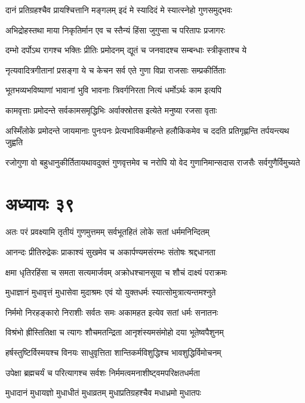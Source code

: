 \twolineshloka
{दानं प्रतिग्रहश्चैव प्रायश्चित्तानि मङ्गलम्}
{इदं मे स्यादिदं मे स्यात्स्नेहो गुणसमुद्भवः}


\twolineshloka
{अभिद्रोहस्तथा माया निकृतिर्मान एव च}
{स्तैन्यं हिंसा जुगुप्सा च परितापः प्रजागरः}


\twolineshloka
{दम्भो दर्पोऽथ रागश्च भक्तिः प्रीतिः प्रमोदनम्}
{द्यूतं च जनवादश्च सम्बन्धाः स्त्रीकृताश्च ये}


\twolineshloka
{नृत्यवादित्रगीतानां प्रसङ्गा ये च केचन}
{सर्व एते गुणा विप्रा राजसाः सम्प्रकीर्तिताः}


\twolineshloka
{भूतभव्यभविष्याणां भावानां भुवि भावनाः}
{त्रिवर्गनिरता नित्यं धर्मोऽर्थः काम इत्यपि}


\twolineshloka
{कामवृत्ताः प्रमोदन्ते सर्वकामसमृद्धिभिः}
{अर्वाक्स्रोतस इत्येते मनुष्या रजसा वृताः}


\threelineshloka
{अस्मिँलोके प्रमोदन्ते जायमानाः पुनःपनः}
{प्रेत्यभाविकमीहन्ते हलौकिकमेव च}
{ददति प्रतिगृह्णन्ति तर्पयन्त्यथ जुह्वति}


\twolineshloka
{रजोगुणा वो बहुधानुकीर्तितायथावदुक्तं गुणवृत्तमेव च}
{नरोपि यो वेद गुणानिमान्सदास राजसैः सर्वगुणैर्विमुच्यते}


\chapter{अध्यायः ३९}
\twolineshloka
{अतः परं प्रवक्ष्यामि तृतीयं गुणमुत्तमम्}
{सर्वभूतहितं लोके सतां धर्ममनिन्दितम्}


\twolineshloka
{आनन्दः प्रीतिरुद्रेकः प्राकाश्यं सुखमेव च}
{अकार्पण्यमसंरम्भः संतोषः श्रद्दधानता}


\twolineshloka
{क्षमा धृतिरहिंसा च समता सत्यमार्जवम्}
{अक्रोधश्चानसूया च शौचं दाक्ष्यं पराक्रमः}


\twolineshloka
{मुधाज्ञानं मुधावृत्तं मुधासेवा मुदाश्रमः}
{एवं यो युक्तधर्मः स्यात्सोमुत्रात्यन्तमश्नुते}


\twolineshloka
{निर्ममो निरहङ्कारो निराशीः सर्वतः समः}
{अकामहत इत्येव सतां धर्मः सनातनः}


\twolineshloka
{विश्रंभो ह्रीस्तितिक्षा च त्यागः शौचमतन्द्रिता}
{आनृशंस्यमसंमोहो दया भूतेष्वपैशुनम्}


\twolineshloka
{हर्षस्तुष्टिर्विस्मयश्च विनयः साधुवृत्तिता}
{शान्तिकर्मविशुद्धिश्च भावशुद्धिर्विमोचनम्}


\twolineshloka
{उपेक्षा ब्रह्मचर्यं च परित्यागश्च सर्वशः}
{निर्ममत्वमनाशीष्ट्वमपरिक्षतधर्मता}


\twolineshloka
{मुधादानं मुधायज्ञो मुधाधीतं मुधाव्रतम्}
{मुधाप्रतिग्रहश्चैव मधाध्रमो मुधातपः}



